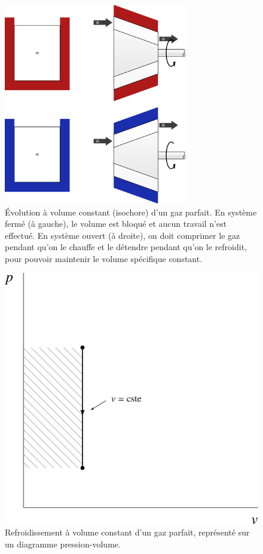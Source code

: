 		\begin{figure}
			\begin{center}
				\includegraphics[width=8cm]{images/volume_constant.png}
			\end{center}
			\caption{Évolution à volume constant (isochore) d’un gaz parfait. En système fermé (à gauche), le volume est bloqué et aucun travail n’est effectué. En système ouvert (à droite), on doit comprimer le gaz pendant qu’on le chauffe et le détendre pendant qu’on le refroidit, pour pouvoir maintenir le volume spécifique constant.}
			\label{fig_gp_volume_constant}
		\end{figure}
		
		\begin{figure}
			\begin{center}
				\includegraphics[width=\pvdiagramwidth]{images/pv_isochore.png}
			\end{center}
			\caption{Refroidissement à volume constant d’un gaz parfait, représenté sur un diagramme pression-volume.}
			\label{fig_gp_volume_constant_pv}
		\end{figure}		

